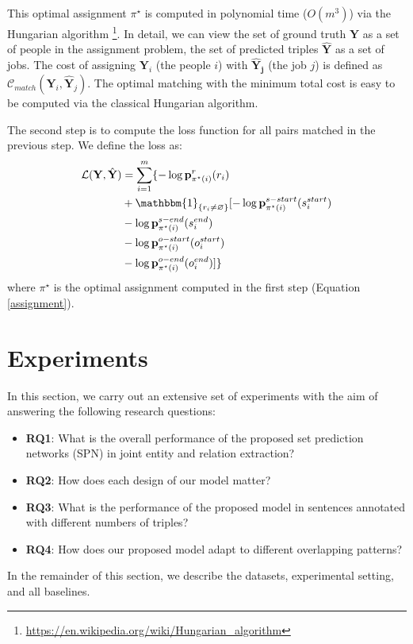 \documentclass[letterpaper]{article} \usepackage{aaai21}  \usepackage{times}  \usepackage{helvet} \usepackage{courier}  \usepackage[hyphens]{url}  \usepackage{graphicx} \usepackage{amsfonts,amssymb}
\begin{document}
This optimal assignment $\pi^\star$ is computed in polynomial time ($O(m^3)$) via the Hungarian algorithm \footnote{ \url{https://en.wikipedia.org/wiki/Hungarian_algorithm}}. In detail, we can view the set of ground truth $\mathbf{Y}$ as a set of people in the assignment problem, the set of predicted triples $\mathbf{\hat{Y}}$ as a set of jobs. The cost of assigning $\mathbf{Y}_i$ (the people $i$) with $\mathbf{\hat{Y}_j}$ (the job $j$) is defined as  $\mathcal{C}_{match}(\mathbf{Y}_i, \hat{\mathbf{Y}}_{j})$. The optimal matching with the minimum total cost is easy to be computed via the classical Hungarian algorithm.

The second step is to compute the loss function for all pairs matched in the previous step. We define the loss as:
\begin{equation}
\begin{split}
    \mathcal{L}(\mathbf{Y}, \hat{\mathbf{Y}})  &= \sum \limits_{i=1}^m\{-\log \mathbf{p}^r_{\pi^\star(i)}(r_i) \\
    & + \mathbbm{1} _{\{r_i \neq \varnothing\}}[-\log \mathbf{p}^{s-start}_{\pi^\star(i)}(s_i^{start})\\
    &-  \log \mathbf{p}^{s-end}_{\pi^\star(i)}(s_i^{end})\\
    & - \log \mathbf{p}^{o-start}_{\pi^\star(i)}(o_i^{start}) \\
    & - \log \mathbf{p}^{o-end}_{\pi^\star(i)}(o_i^{end})]\}
\end{split}
\label{loss_equ}
\end{equation}
where $\pi^\star$ is the optimal assignment computed in the first step  (Equation \ref{assignment}).
\section{Experiments}
In this section, we carry out an extensive set of experiments with the aim of answering the following research questions: 
\begin{itemize}
    \item  \textbf{RQ1}: What is the overall performance of the proposed set prediction networks (SPN) in joint entity and relation extraction?
    \item \textbf{RQ2}: How does each design of our model matter? 
    \item \textbf{RQ3}: What is the performance of the proposed model in sentences annotated with different numbers of triples?
    \item \textbf{RQ4}: How does our proposed model adapt to different overlapping patterns?
\end{itemize}
In the remainder of this section, we describe the datasets, experimental setting, and all baselines.
\end{document}
